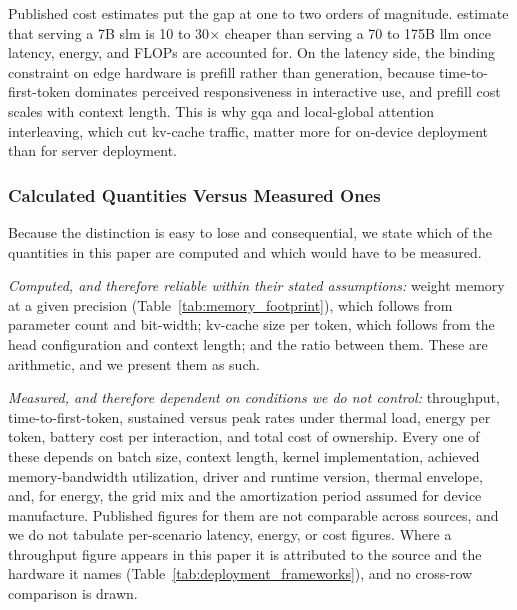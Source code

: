 Published cost estimates put the gap at one to two orders of magnitude.
\citet{belcak2025slm_agentic} estimate that serving a 7B \gls{slm} is 10 to
30$\times$ cheaper than serving a 70 to 175B \gls{llm} once latency, energy, and
FLOPs are accounted for. On the latency side, the binding constraint on edge
hardware is prefill rather than generation, because time-to-first-token dominates
perceived responsiveness in interactive use, and prefill cost scales with context
length. This is why \gls{gqa} and local-global attention interleaving, which cut
\gls{kv}-cache traffic, matter more for on-device deployment than for server
deployment.

\subsubsection{Calculated Quantities Versus Measured Ones}
\label{subsec:deployment_calc_vs_meas}

Because the distinction is easy to lose and consequential, we state which of the
quantities in this paper are computed and which would have to be measured.

\emph{Computed, and therefore reliable within their stated assumptions:} weight
memory at a given precision (Table~\ref{tab:memory_footprint}), which follows from
parameter count and bit-width; \gls{kv}-cache size per token, which follows from
the head configuration and context length; and the ratio between them. These are
arithmetic, and we present them as such.

\emph{Measured, and therefore dependent on conditions we do not control:}
throughput, time-to-first-token, sustained versus peak rates under thermal
load, energy per token, battery cost per interaction, and total cost of
ownership. Every one of these depends on batch size, context length, kernel
implementation, achieved memory-bandwidth utilization, driver and runtime
version, thermal envelope, and, for energy, the grid mix and the amortization
period assumed for device manufacture. Published figures for them are not
comparable across sources, and we do not tabulate per-scenario latency, energy,
or cost figures. Where a throughput figure appears in this paper it is attributed
to the source and the hardware it names (Table~\ref{tab:deployment_frameworks}),
and no cross-row comparison is drawn.

